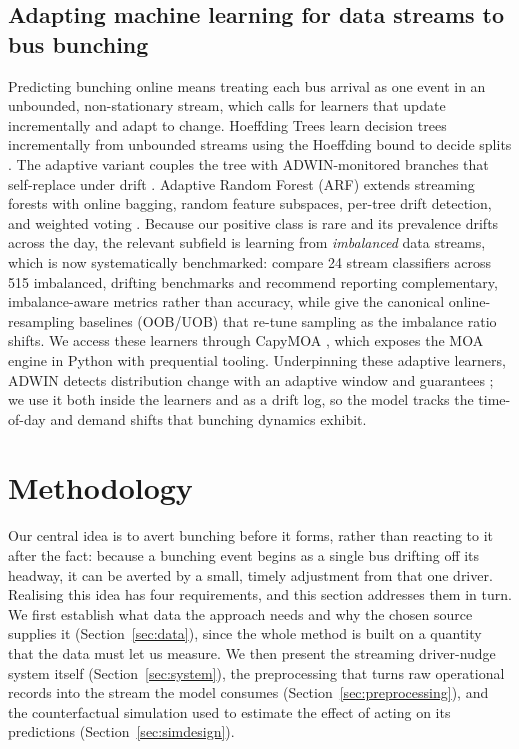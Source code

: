 \documentclass[11pt,a4paper]{article}
\begin{document}
\subsection{Adapting machine learning for data streams to bus bunching}
\label{sec:rw-ml}
Predicting bunching online means treating each bus arrival as one event in an unbounded,
non-stationary stream, which calls for learners that update incrementally and adapt to change.
Hoeffding Trees learn decision trees incrementally from unbounded streams using the Hoeffding
bound to decide splits \citep{Domingos2000}. The adaptive variant couples the tree with
ADWIN-monitored branches that self-replace under drift \citep{Bifet2009}. Adaptive Random
Forest (ARF) extends streaming forests with online bagging, random feature subspaces, per-tree
drift detection, and weighted voting \citep{Gomes2017}. Because our positive class is rare and its
prevalence drifts across the day, the relevant subfield is learning from \emph{imbalanced} data
streams, which is now systematically benchmarked: \citet{Aguiar2024} compare 24 stream classifiers
across 515 imbalanced, drifting benchmarks and recommend reporting complementary, imbalance-aware
metrics rather than accuracy, while \citet{WangMinkuYao2015} give the canonical online-resampling
baselines (OOB/UOB) that re-tune sampling as the imbalance ratio shifts. We access these learners
through CapyMOA \citep{CapyMOA2024}, which exposes the MOA engine in Python with prequential
tooling. Underpinning these adaptive learners, ADWIN detects distribution change with an adaptive
window and guarantees \citep{Bifet2007}; we use it both inside the learners and as a drift log,
so the model tracks the time-of-day and demand shifts that bunching dynamics exhibit.

\section{Methodology}
\label{sec:method}

Our central idea is to avert bunching before it forms, rather than reacting to it after the fact:
because a bunching event begins as a single bus drifting off its headway, it can be averted by a
small, timely adjustment from that one driver. Realising this idea has four requirements, and this
section addresses them in turn. We first establish what data the approach needs and why the chosen
source supplies it (Section~\ref{sec:data}), since the whole method is built on a quantity that the
data must let us measure. We then present the streaming driver-nudge system itself
(Section~\ref{sec:system}), the preprocessing that turns raw operational records into the stream the
model consumes (Section~\ref{sec:preprocessing}), and the counterfactual simulation used to estimate
the effect of acting on its predictions (Section~\ref{sec:simdesign}).
\end{document}
